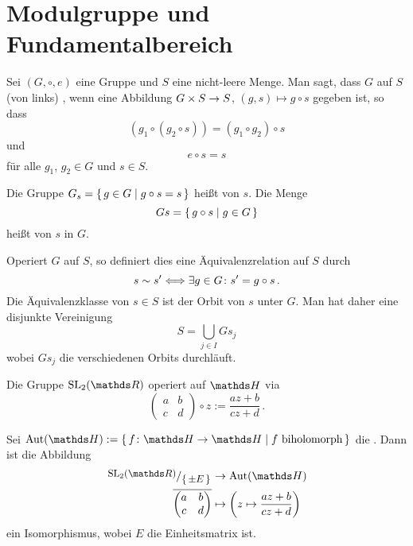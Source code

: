 \section{Modulgruppe und Fundamentalbereich}

\begin{defi}
Sei $(G, \circ, e)$ eine Gruppe und $S$ eine nicht-leere Menge. Man sagt, dass $G$ auf $S$ (von links) , wenn eine Abbildung $G \times S \rightarrow S$, $(g, s) \mapsto g \circ s$ gegeben ist, so dass
\[
	(g_1 \circ (g_2 \circ s)) = (g_1 \circ g_2) \circ s
\]
und
\[
	e \circ s = s
\]
für alle $g_1$, $g_2 \in G$ und $s \in S$.

Die Gruppe $G_s = \left\{\,g \in G \mid g \circ s = s\,\right\}$ heißt  von $s$.
Die Menge
\[
	Gs = \left\{\,g \circ s \mid g\in G\,\right\}
\]
heißt  von $s$ in $G$.
\end{defi}

Operiert $G$ auf $S$, so definiert dies eine Äquivalenzrelation auf $S$ durch
\[
	s \sim s'
	\Longleftrightarrow \exists g \in G\colon s' = g \circ s
	\,.
\]
Die Äquivalenzklasse von $s \in S$ ist der Orbit von $s$ unter $G$.
Man hat daher eine disjunkte Vereinigung 
\[
	S = \bigcup_{j\in I} Gs_j
\]
wobei $Gs_j$ die verschiedenen Orbits durchläuft.

\begin{satz-list}
\item Die Gruppe $\SL_2(\RR)$ operiert auf $\HH$ via
\[
		\begin{pmatrix}
			a & b \\
			c & d
		\end{pmatrix}
		\circ z
	:= \frac{az+b}{cz+d}
	\,.
\]

\item Sei $\Aut(\HH) := \Set{f\colon\HH \ra \HH \mid f \text{ biholomorph}}$ die .
Dann ist die Abbildung
\begin{align*}
	\modulo{\SL_2(\RR)}{\Set{\pm E}} &\ra \Aut(\HH)\\
		\overline{\begin{pmatrix}
			a & b \\
			c & d
		\end{pmatrix}}
		&\mapsto
		\left( z \mapsto \frac{az+b}{cz+d} \right)
\end{align*}
ein Isomorphismus, wobei $E$ die Einheitsmatrix ist.
\end{satz-list}

